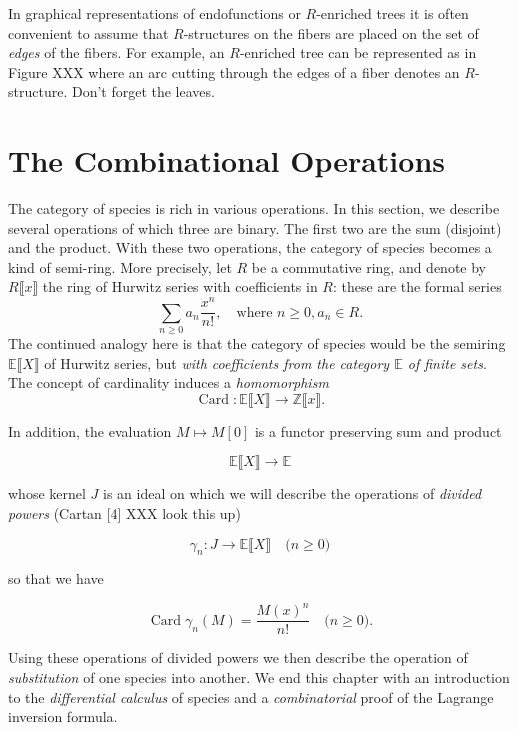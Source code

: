 \documentclass{article}
\theoremstyle{definition}
\theoremstyle{remark}
\newcommand{\E}{\mathbb{E}}
\newcommand{\Z}{\mathbb{Z}}
\DeclareMathOperator{\Card}{Card}
\newcommand{\term}[1]{\emph{#1}}
\begin{document}
In graphical representations of endofunctions or $R$-enriched trees it
is often convenient to assume that $R$-structures on the fibers are
placed on the set of \emph{edges} of the fibers.  For example, an
$R$-enriched tree can be represented as in Figure XXX  where an arc cutting through the edges of a fiber denotes an
$R$-structure. Don't forget the leaves.

\section{The Combinational Operations}
\label{sec:combinatorial-operations}

\newcommand{\Poly}[2]{#1 \llbracket #2 \rrbracket}

The category of species is rich in various operations. In this
section, we describe several operations of which three are binary.
The first two are the sum (disjoint) and the product. With these two
operations, the category of species becomes a kind of semi-ring.  More
precisely, let $R$ be a commutative ring, and denote by $\Poly R x$
the ring of Hurwitz series with coefficients in $R$: these are the
formal series
\[ \sum_{n \geq 0} a_n \frac{x^n}{n!}, \quad \text{where $n \geq 0,
  a_n \in R$.} \] The continued analogy here is that the category of
species would be the semiring $\Poly{\E}{X}$ of Hurwitz series, but
\emph{with coefficients from the category $\E$ of finite sets}. The
concept of cardinality induces a \emph{homomorphism}
\[ \Card : \Poly{\E}{X} \to \Poly{\Z}{x}. \]

In addition, the evaluation $M \mapsto M [0]$ is a functor preserving sum and
product

\[ \Poly \E X \to \E \]

whose kernel $J$ is an ideal on which we will describe the operations
of \term{divided powers} (Cartan [4] XXX look this up)

\[ \gamma_n : J \to \Poly \E X \quad \text{($n \geq 0$)} \]



so that we have


\[ \Card \gamma_n(M) = \frac{M(x)^n}{n!} \quad \text{($n \geq 0$)}. \]



Using these operations of divided powers we then describe
the operation of \term{substitution} of one species into another. We end this
chapter with an introduction to the \term{differential calculus} of species
and a \emph{combinatorial} proof of the Lagrange inversion formula.
\end{document}

